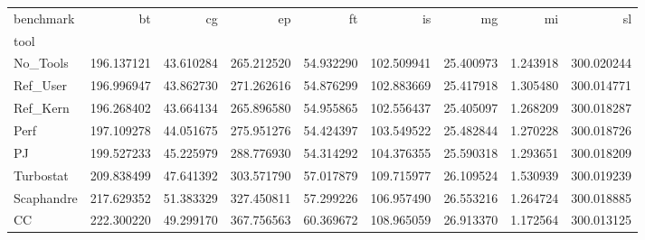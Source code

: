 \begin{tabular}{lrrrrrrrr}
\toprule
benchmark & bt & cg & ep & ft & is & mg & mi & sl \\
tool &  &  &  &  &  &  &  &  \\
\midrule
No_Tools & 196.137121 & 43.610284 & 265.212520 & 54.932290 & 102.509941 & 25.400973 & 1.243918 & 300.020244 \\
Ref_User & 196.996947 & 43.862730 & 271.262616 & 54.876299 & 102.883669 & 25.417918 & 1.305480 & 300.014771 \\
Ref_Kern & 196.268402 & 43.664134 & 265.896580 & 54.955865 & 102.556437 & 25.405097 & 1.268209 & 300.018287 \\
Perf & 197.109278 & 44.051675 & 275.951276 & 54.424397 & 103.549522 & 25.482844 & 1.270228 & 300.018726 \\
PJ & 199.527233 & 45.225979 & 288.776930 & 54.314292 & 104.376355 & 25.590318 & 1.293651 & 300.018209 \\
Turbostat & 209.838499 & 47.641392 & 303.571790 & 57.017879 & 109.715977 & 26.109524 & 1.530939 & 300.019239 \\
Scaphandre & 217.629352 & 51.383329 & 327.450811 & 57.299226 & 106.957490 & 26.553216 & 1.264724 & 300.018885 \\
CC & 222.300220 & 49.299170 & 367.756563 & 60.369672 & 108.965059 & 26.913370 & 1.172564 & 300.013125 \\
\bottomrule
\end{tabular}
